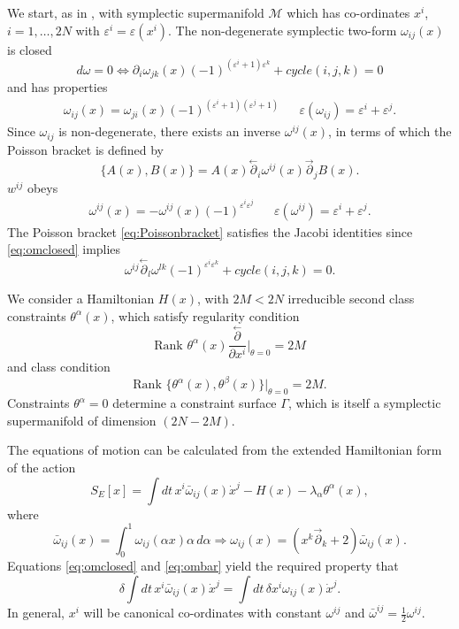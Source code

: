 \documentclass[a4paper,12pt]{article}
\theoremstyle{definition}
\theoremstyle{remark}
\numberwithin{equation}{section}
\newcommand{\al}{\alpha}
\newcommand{\be}{\beta}
\newcommand{\de}{\delta}
\newcommand{\la}{\lambda}
\newcommand{\om}{\omega}
\newcommand{\eps}{\varepsilon}
\newcommand{\Imp}{\Rightarrow}
\newcommand{\M}{\mathcal{M}}
\newcommand{\dx}{\dot{x}}
\newcommand{\pa}{\partial}
\newcommand{\pl}{\overset{\leftarrow}{\partial}}
\newcommand{\pr}{\overset{\rightarrow}{\partial}}
\begin{document}
We start, as in \cite{Batalin:2001hs}, with symplectic
supermanifold $\M$ which has co-ordinates $x^i$, $i=1,\ldots,2N$
with $\eps^i=\eps(x^i)$. The non-degenerate symplectic two-form
$\om_{ij}(x)$ is closed
\begin{equation}\label{eq:omclosed}
d\om=0 \Leftrightarrow \pa_i\om_{jk}(x)(-1)^{(\eps^i+1)\eps^k} +
cycle(i,j,k)=0
\end{equation}
and has properties
\begin{eqnarray}
\om_{ij}(x)=\om_{ji}(x)(-1)^{(\eps^i+1)(\eps^j+1)} &&
\eps(\om_{ij})=\eps^i + \eps^j.
\end{eqnarray}
Since $\om_{ij}$ is non-degenerate, there exists an inverse
$\om^{ij}(x)$, in terms of which the Poisson bracket is defined by
\begin{equation}\label{eq:Poissonbracket}
\{A(x),B(x)\}=A(x)\pl_i \om^{ij}(x) \pr_j B(x).
\end{equation}
$w^{ij}$ obeys
\begin{eqnarray}
\om^{ij}(x)=-\om^{ij}(x)(-1)^{\eps^i\eps^j} &&
\eps(\om^{ij})=\eps^i + \eps^j.
\end{eqnarray}
The Poisson bracket \eqref{eq:Poissonbracket} satisfies the Jacobi
identities since \eqref{eq:omclosed} implies
\begin{equation}
\om^{ij}\pl_l \om^{lk}(-1)^{\eps^i\eps^k} + cycle(i,j,k)=0.
\end{equation}

We consider a Hamiltonian $H(x)$, with $2M<2N$ irreducible second
class constraints $\theta^{\al}(x)$, which satisfy regularity
condition
\begin{equation}\label{eq:regular}
\text{Rank } \theta^{\al}(x){\frac{\pl}{\partial x^i}}
|_{\theta=0}=2M
\end{equation}
and class condition
\begin{equation}\label{eq:classcnd}
\text{Rank }{\{\theta^{\al}(x),\theta^{\be}(x)\}}|_{\theta=0}=2M.
\end{equation}
Constraints $\theta^{\al}=0$ determine a constraint surface
$\Gamma$, which is itself a symplectic supermanifold of dimension
$(2N-2M)$.

The equations of motion can be calculated from the extended
Hamiltonian form of the action
\begin{equation}
S_E[x]=\int{dt\, x^i \bar{\om}_{ij}(x) \dx^j - H(x)
-\la_{\al}\theta^{\al}(x)},
\end{equation}
where \cite{Batalin:1998pz}
\begin{equation}\label{eq:ombar}
\bar{\om}_{ij}(x)=\int_{0}^{1}{\om_{ij}(\al x)\al \, d\al} \Imp
\om_{ij}(x)=(x^k\pr_k+2)\bar{\om}_{ij}(x).
\end{equation}
Equations \eqref{eq:omclosed} and \eqref{eq:ombar} yield the
required property that
\begin{equation}
\de \int{dt \, x^i\bar{\om}_{ij}(x)\dx^j}=\int{dt\, \de x^i
\om_{ij}(x)\dx^j}.
\end{equation}
In general, $x^i$ will be canonical co-ordinates with constant
$\om^{ij}$ and $\bar{\om}^{ij}=\frac{1}{2} \om^{ij}$.
\end{document}
